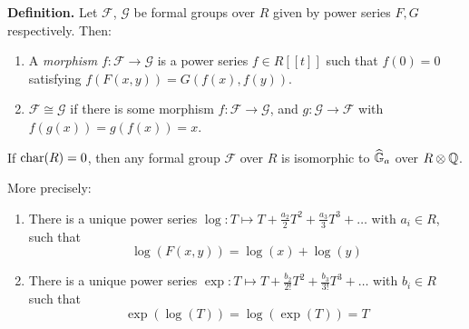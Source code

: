 \documentclass[10pt,a4paper]{article}
\begin{document}
\textbf{Definition.} Let $\mathcal{F}$, $\mathcal{G}$ be formal groups over $R$ given by power series $F, G$ respectively. Then:
\begin{enumerate}
  \item A \emph{morphism} $f: \mathcal{F} \to \mathcal{G}$ is a power series $f \in R[[t]]$ such that $f(0)=0$ satisfying $f(F(x, y)) = G(f(x), f(y))$.
  \item $\mathcal{F} \cong \mathcal{G}$ if there is some morphism $f : \mathcal{F} \to \mathcal{G}$, and $g: \mathcal{G} \to \mathcal{F}$ with $f(g(x))=g(f(x)) = x$.
\end{enumerate}
\begin{theorem}
  If $\operatorname{char}(R) = 0$, then any formal group $\mathcal{F}$ over $R$ is isomorphic to $\widehat{\mathbb{G}}_a$ over $R \otimes \mathbb{Q}$.

  More precisely:
  \begin{enumerate}
    \item There is a unique power series $\log: T\mapsto T+\frac{a_2}{2}T^2+\frac{a_3}{3}T^3+\ldots$ with $a_i \in R$, such that \[\log(F(x,y)) = \log(x)+\log(y)\tag{\ast}\]
    \item There is a unique power series $\exp: T \mapsto T + \frac{b_2}{2!}T^2 + \frac{b_3}{3!}T^3+\ldots$ with $b_i \in R$ such that \[\exp(\log(T)) = \log(\exp(T)) = T\]
  \end{enumerate}
\end{theorem}
\end{document}
